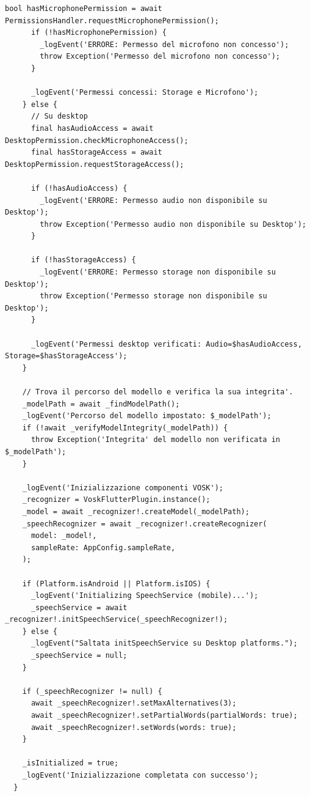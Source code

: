 \documentclass[14pt]{extbook}
\begin{document}
\begin{lstlisting}[caption=vosk\_service.dart, label=lst:VoskService]
      bool hasMicrophonePermission = await PermissionsHandler.requestMicrophonePermission();
      if (!hasMicrophonePermission) {
        _logEvent('ERRORE: Permesso del microfono non concesso');
        throw Exception('Permesso del microfono non concesso');
      }

      _logEvent('Permessi concessi: Storage e Microfono');
    } else {
      // Su desktop
      final hasAudioAccess = await DesktopPermission.checkMicrophoneAccess();
      final hasStorageAccess = await DesktopPermission.requestStorageAccess();

      if (!hasAudioAccess) {
        _logEvent('ERRORE: Permesso audio non disponibile su Desktop');
        throw Exception('Permesso audio non disponibile su Desktop');
      }

      if (!hasStorageAccess) {
        _logEvent('ERRORE: Permesso storage non disponibile su Desktop');
        throw Exception('Permesso storage non disponibile su Desktop');
      }

      _logEvent('Permessi desktop verificati: Audio=$hasAudioAccess, Storage=$hasStorageAccess');
    }

    // Trova il percorso del modello e verifica la sua integrita'.
    _modelPath = await _findModelPath();
    _logEvent('Percorso del modello impostato: $_modelPath');
    if (!await _verifyModelIntegrity(_modelPath)) {
      throw Exception('Integrita' del modello non verificata in $_modelPath');
    }

    _logEvent('Inizializzazione componenti VOSK');
    _recognizer = VoskFlutterPlugin.instance();
    _model = await _recognizer!.createModel(_modelPath);
    _speechRecognizer = await _recognizer!.createRecognizer(
      model: _model!,
      sampleRate: AppConfig.sampleRate,
    );

    if (Platform.isAndroid || Platform.isIOS) {
      _logEvent('Initializing SpeechService (mobile)...');
      _speechService = await _recognizer!.initSpeechService(_speechRecognizer!);
    } else {
      _logEvent("Saltata initSpeechService su Desktop platforms.");
      _speechService = null;
    }

    if (_speechRecognizer != null) {
      await _speechRecognizer!.setMaxAlternatives(3);
      await _speechRecognizer!.setPartialWords(partialWords: true);
      await _speechRecognizer!.setWords(words: true);
    }

    _isInitialized = true;
    _logEvent('Inizializzazione completata con successo');
  }


\end{lstlisting}
\end{document}
